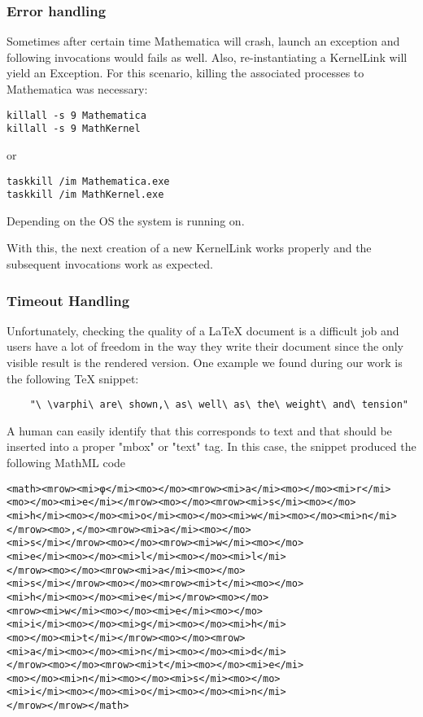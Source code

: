\subsubsection{Error handling}
Sometimes after certain time Mathematica will crash, launch an exception and following invocations would fails as well.
Also, re-instantiating a KernelLink will yield an Exception. For this scenario, killing the associated processes to Mathematica was necessary:

\begin{verbatim}
killall -s 9 Mathematica
killall -s 9 MathKernel
\end{verbatim} 

or 

\begin{verbatim}
taskkill /im Mathematica.exe
taskkill /im MathKernel.exe
\end{verbatim} 

Depending on the OS the system is running on.

With this, the next creation of a new KernelLink works properly and the subsequent invocations work as expected.

\subsubsection{Timeout Handling}
Unfortunately, checking the quality of a LaTeX document is a difficult job and users have a lot of freedom in the way they write their document since the only visible result is the rendered version. 
One example we found during our work is the following TeX snippet:
\begin{verbatim}
	"\ \varphi\ are\ shown,\ as\ well\ as\ the\ weight\ and\ tension"
\end{verbatim}
A human can easily identify that this corresponds to text and that should be inserted into a proper "mbox" or "text" tag. In this case, the snippet produced the following MathML code
\begin{verbatim}
<math><mrow><mi>φ</mi><mo></mo><mrow><mi>a</mi><mo></mo><mi>r</mi>
<mo></mo><mi>e</mi></mrow><mo></mo><mrow><mi>s</mi><mo></mo>
<mi>h</mi><mo></mo><mi>o</mi><mo></mo><mi>w</mi><mo></mo><mi>n</mi>
</mrow><mo>,</mo><mrow><mi>a</mi><mo></mo>
<mi>s</mi></mrow><mo></mo><mrow><mi>w</mi><mo></mo>
<mi>e</mi><mo></mo><mi>l</mi><mo></mo><mi>l</mi>
</mrow><mo></mo><mrow><mi>a</mi><mo></mo>
<mi>s</mi></mrow><mo></mo><mrow><mi>t</mi><mo></mo>
<mi>h</mi><mo></mo><mi>e</mi></mrow><mo></mo>
<mrow><mi>w</mi><mo></mo><mi>e</mi><mo></mo>
<mi>i</mi><mo></mo><mi>g</mi><mo></mo><mi>h</mi>
<mo></mo><mi>t</mi></mrow><mo></mo><mrow>
<mi>a</mi><mo></mo><mi>n</mi><mo></mo><mi>d</mi>
</mrow><mo></mo><mrow><mi>t</mi><mo></mo><mi>e</mi>
<mo></mo><mi>n</mi><mo></mo><mi>s</mi><mo></mo>
<mi>i</mi><mo></mo><mi>o</mi><mo></mo><mi>n</mi>
</mrow></mrow></math>
\end{verbatim}

